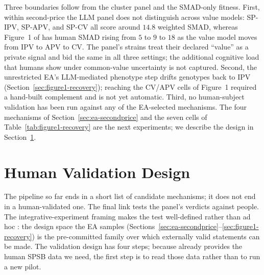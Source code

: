 \documentclass[12pt]{article}
\newcommand{\SPSB}{SPSB}
\begin{document}
Three boundaries follow from the cluster panel and the SMAD-only
fitness. First, within second-price the LLM panel does not
distinguish across value models: SP-IPV, SP-APV, and SP-CV all
score around $14.8$ weighted SMAD, whereas Figure~1 of
\citet{zhuLLMAuction2024} has human SMAD rising from $5$ to $9$ to
$18$ as the value model moves from IPV to APV to CV. The panel's
strains treat their declared ``value'' as a private signal and bid
the same in all three settings; the additional cognitive load that
humans show under common-value uncertainty is not captured. Second,
the unrestricted EA's LLM-mediated phenotype step drifts genotypes
back to IPV (Section~\ref{sec:figure1-recovery}); reaching the
CV/APV cells of Figure~1 required a hand-built complement and is
not yet automatic. Third, no human-subject validation has been run
against any of the EA-selected mechanisms. The four mechanisms of
Section~\ref{sec:ea-secondprice} and the seven cells of
Table~\ref{tab:figure1-recovery} are the next experiments; we
describe the design in Section~\ref{sec:validation}.

\section{Human Validation Design}
\label{sec:validation}

The pipeline so far ends in a short list of candidate mechanisms; it
does not end in a human-validated one. The final link tests the
panel's verdicts against people. The integrative-experiment framing
makes the test well-defined rather than ad hoc
\citep{almaatouq2024,alsobay2025integrative}: the design space the
EA samples (Sections~\ref{sec:ea-secondprice}--\ref{sec:figure1-recovery})
is the pre-committed family over which externally valid statements
can be made. The validation design has four steps; because
\citet{li2017} already provides the human \SPSB{} data we need, the
first step is to read those data rather than to run a new pilot.
\end{document}
